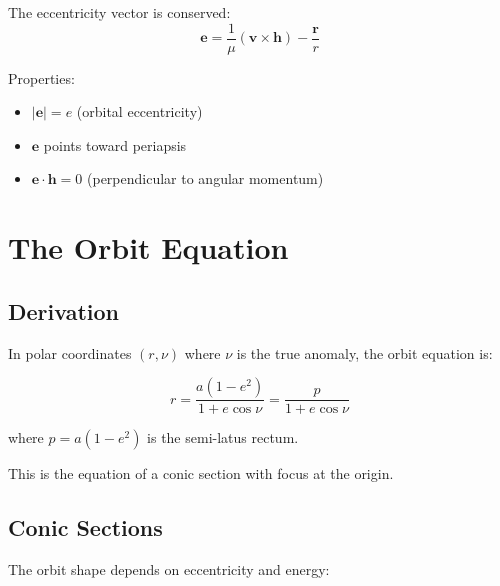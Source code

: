 The eccentricity vector is conserved:
\begin{equation}
    \mathbf{e} = \frac{1}{\mu}(\mathbf{v} \times \mathbf{h}) - \frac{\mathbf{r}}{r}
\end{equation}

Properties:
\begin{itemize}
    \item $|\mathbf{e}| = e$ (orbital eccentricity)
    \item $\mathbf{e}$ points toward periapsis
    \item $\mathbf{e} \cdot \mathbf{h} = 0$ (perpendicular to angular momentum)
\end{itemize}

\section{The Orbit Equation}

\subsection{Derivation}

In polar coordinates $(r, \nu)$ where $\nu$ is the true anomaly, the orbit equation is:

\begin{equation}
    r = \frac{a(1-e^2)}{1 + e\cos\nu} = \frac{p}{1 + e\cos\nu}
\end{equation}

where $p = a(1-e^2)$ is the semi-latus rectum.

This is the equation of a conic section with focus at the origin.

\subsection{Conic Sections}

The orbit shape depends on eccentricity and energy:

